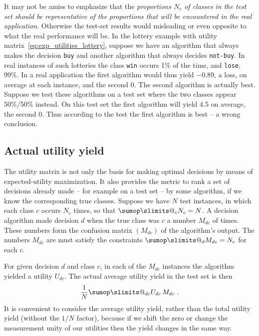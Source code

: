 \documentclass[\ifafour a4paper,12pt,\else a5paper,10pt,\fi%
onecolumn,oneside,article,%
british%
]{memoir}
\makeatletter
\theoremstyle{remark}
\theoremstyle{innote}
\def\sum{\DOTSI\sumop\slimits@}
\renewcommand*{\|}[1][]{\nonscript\:#1\vert\nonscript\:\mathopen{}}
\makeatother
\begin{document}
It may not be amiss to emphasize that the \emph{proportions $N_{c}$ of classes in the test set should be representative of the proportions that will be encountered in the real application}. Otherwise the test-set results would misleading or even opposite to what the real performance will be. In the lottery example with utility matrix~\eqref{eq:exp_utilities_lottery}, suppose we have an algorithm that always makes the decision \texttt{buy} and another algorithm that always decides \texttt{not-buy}. In  real instances of such lotteries the class \texttt{win} occurs 1\% of the time, and \texttt{lose}, 99\%. In a real application the first algorithm would thus yield $-0.89$, a loss, on average at each instance, and the second $0$. The second algorithm is actually best. Suppose we test these algorithms on a test set where the two classes appear 50\%/50\% instead. On this test set the first algorithm will yield $4.5$ on average, the second $0$. Thus according to the test the first algorithm is best -- a wrong conclusion.




\subsection{Actual utility yield}
\label{sec:dt_utility_yield}

The utility matrix is not only the basis for making optimal decisions by means of expected-utility maximization. It also provides the metric to rank a set of decisions already made -- for example on a test set -- by some algorithm, if we know the corresponding true classes. Suppose we have $N$ test instances, in which each class $c$ occurs $N_{c}$ times, so that $\sum_{c} N_{c} = N$. A decision algorithm made decision $d$ when the true class was $c$ a number $M_{dc}$ of times. These numbers form the confusion matrix $(M_{dc})$ of the algorithm's output. The numbers $M_{dc}$ are must satisfy the constraints $\sum_{d} M_{dc} = N_{c}$ for each $c$.

For given decision $d$ and class $c$, in each of the $M_{dc}$ instances the algorithm yielded a utility $U_{dc}$. The actual average utility yield in the test set is then
\begin{equation}
  \label{eq:utility_gained}
 \frac{1}{N} \sum_{dc} U_{dc}\, M_{dc} \ .
\end{equation}
It is convenient to consider the average utility yield, rather than the total utility yield (without the $1/N$ factor), because if we shift the zero or change the measurement unity of our utilities then the yield changes in the same way.
\end{document}
